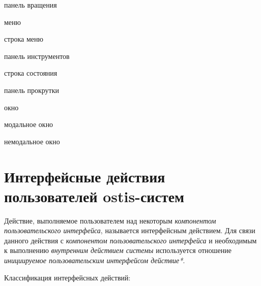 \begin{textitemize}
\begin{textitemize}
\begin{textitemize}
			\item панель вращения
			\item меню
			\item строка меню
			\item панель инструментов
			\item строка состояния
			\item панель прокрутки
			\item окно
			\begin{textitemize}
				\item модальное окно
				\item немодальное окно
			\end{textitemize}
		\end{textitemize}
	\end{textitemize}
\end{textitemize}


\section{Интерфейсные действия пользователей ostis-систем}
\label{sec_interface_user_actions}


Действие, выполняемое пользователем над некоторым \textit{компонентом пользовательского интерфейса}, называется интерфейсным действием. Для связи данного действия с \textit{компонентом пользовательского интерфейса} и необходимым к выполнению \textit{внутренним действием системы} используется отношение \textit{инициируемое пользовательским интерфейсом действие*}.

Классификация интерфейсных действий:

